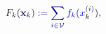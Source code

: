 \documentclass[12pt]{article}
\begin{document}
\makeatletter
\renewcommand*{\@textcolor}[3]{%
  \protect\leavevmode
  \begingroup
    \color#1{#2}#3%
  \endgroup
}
\makeatother
\begin{displaymath}
\mathcolor[RGB]{0,0,15}{F} _ { \mathcolor[RGB]{0,0,30}{k} } \mathcolor[RGB]{0,0,45}{(} { \mathcolor[RGB]{0,0,60}{\bf} \mathcolor[RGB]{0,0,75}{x} } _ { \mathcolor[RGB]{0,0,90}{k} } \mathcolor[RGB]{0,0,105}{)} \mathcolor[RGB]{0,0,120}{:} \mathcolor[RGB]{0,0,135}{=} \mathcolor[RGB]{0,0,150}{\sum} _ { \mathcolor[RGB]{0,0,165}{i} \mathcolor[RGB]{0,0,180}{\in} \mathcal { \mathcolor[RGB]{0,0,195}{V} } } \mathcolor[RGB]{0,0,210}{f} _ { \mathcolor[RGB]{0,0,225}{k} } \mathcolor[RGB]{0,0,240}{(} \mathcolor[RGB]{0,0,255}{x} _ { \mathcolor[RGB]{0,15,0}{k} } ^ { \mathcolor[RGB]{0,15,15}{(} \mathcolor[RGB]{0,15,30}{i} \mathcolor[RGB]{0,15,45}{)} } \mathcolor[RGB]{0,15,60}{)} \mathcolor[RGB]{0,15,75}{,}
\end{displaymath}
\end{document}
